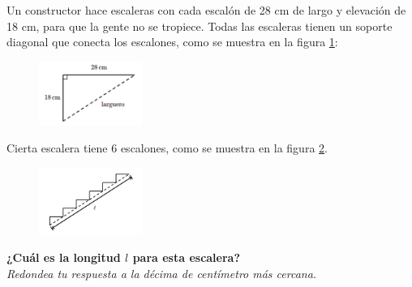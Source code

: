 \question[15]  Un constructor hace escaleras con cada escalón de 28 cm de largo y
elevación de 18 cm, para que la gente no se tropiece. Todas las escaleras tienen un soporte diagonal
que conecta los escalones, como se muestra en la figura \ref{fig:des_pitagoras_02a}:

\begin{figure}[H]
    \begin{center}
        \includegraphics[width=0.3\textwidth]{../images/des_pitagoras_02a.png}
    \end{center}
    \caption{}
    \label{fig:des_pitagoras_02a}
\end{figure}
Cierta escalera tiene 6 escalones, como se muestra en la figura \ref{fig:des_pitagoras_02b}.
\begin{figure}[H]
    \begin{center}
        \includegraphics[width=0.3\textwidth]{../images/des_pitagoras_02b.png}
    \end{center}
    \caption{}
    \label{fig:des_pitagoras_02b}
\end{figure}
\textbf{¿Cuál es la longitud $l$ para esta escalera?}\\
\textit{Redondea tu respuesta a la décima de centímetro más cercana.}